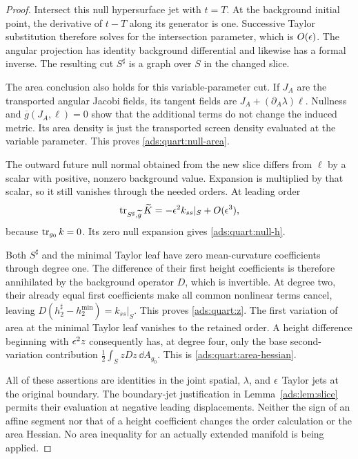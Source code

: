 \begin{proof}
Intersect this null hypersurface jet with \(t=T\).  At the background
initial point, the derivative of \(t-T\) along its generator is one.
Successive Taylor substitution therefore solves for the intersection
parameter, which is \(O(\epsilon)\).  The angular projection has identity
background differential and likewise has a formal inverse.  The
resulting cut \(S^\sharp\) is a graph over \(S\) in the changed
slice.

The area conclusion also holds for this variable-parameter cut.  If
\(J_A\) are the transported angular Jacobi fields, its tangent fields
are \(J_A+(\partial_A\lambda)\ell\).  Nullness and
\(\overline g(J_A,\ell)=0\) show that the additional terms do not
change the induced metric.  Its area density is just the transported
screen density evaluated at the variable parameter.  This proves
\eqref{ads:quart:null-area}.

The outward future null normal obtained from the new slice differs
from \(\ell\) by a scalar with positive, nonzero background value.
Expansion is multiplied by that scalar, so it still vanishes through
the needed orders.  At leading order
\[
 \operatorname{tr}_{S^\sharp,\widetilde g}\widetilde K
       =-\epsilon^2k_{ss}|_S+O(\epsilon^3),
\]
because \(\operatorname{tr}_{g_0}k=0\).  Its zero null expansion gives
\eqref{ads:quart:null-h}.

Both \(S^\sharp\) and the minimal Taylor leaf have zero mean-curvature
coefficients through degree one.  The difference of their first height
coefficients is therefore annihilated by the background operator
\(D\), which is invertible.  At degree two, their already equal first
coefficients make all common nonlinear terms cancel, leaving
\(D(h_2^\sharp-h_2^{\min})=k_{ss}|_S\).  This proves
\eqref{ads:quart:z}.  The first variation of area at the minimal Taylor
leaf vanishes to the retained order.  A height difference beginning
with \(\epsilon^2z\) consequently has, at degree four, only the base
second-variation contribution
\(\frac12\int_S zDz\,\dd A_{g_0}\).  This is
\eqref{ads:quart:area-hessian}.

All of these assertions are identities in the joint spatial,
\(\lambda\), and \(\epsilon\) Taylor jets at the original boundary.
The boundary-jet justification in Lemma~\ref{ads:lem:slice} permits their
evaluation at negative leading displacements.  Neither the sign of an
affine segment nor that of a height coefficient changes the order
calculation or the area Hessian.  No area inequality for an actually
extended manifold is being applied.
\end{proof}

